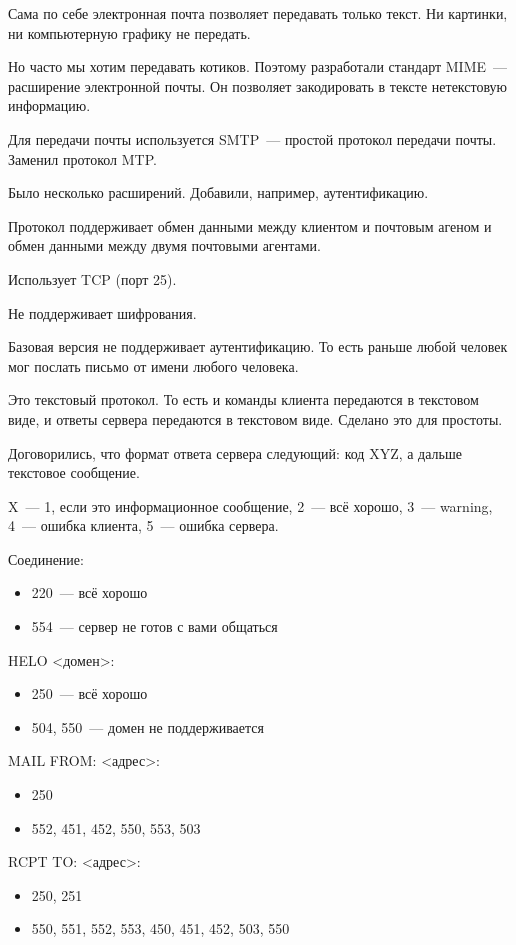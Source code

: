 Сама по себе электронная почта позволяет передавать только текст. Ни картинки, ни компьютерную графику не передать.

Но часто мы хотим передавать котиков. Поэтому разработали стандарт MIME~--- расширение электронной почты. Он позволяет закодировать в тексте нетекстовую информацию.


Для передачи почты используется SMTP~--- простой протокол передачи почты. Заменил протокол MTP.

Было несколько расширений. Добавили, например, аутентификацию. 

Протокол поддерживает обмен данными между клиентом и почтовым агеном и обмен данными между двумя почтовыми агентами.

Использует TCP (порт 25).

Не поддерживает шифрования.

Базовая версия не поддерживает аутентификацию. То есть раньше любой человек мог послать письмо от имени любого человека.

Это текстовый протокол. То есть и команды клиента передаются в текстовом виде, и ответы сервера передаются в текстовом виде. Сделано это для простоты.

Договорились, что формат ответа сервера следующий: код XYZ, а дальше текстовое сообщение.

X~--- 1, если это информационное сообщение, 2~--- всё хорошо, 3~--- warning, 4~--- ошибка клиента, 5~--- ошибка сервера.

Соединение:
\begin{itemize}
    \item 220~--- всё хорошо
    \item 554~--- сервер не готов с вами общаться
\end{itemize}

HELO <домен>:
\begin{itemize}
    \item 250~--- всё хорошо
    \item 504, 550~--- домен не поддерживается
\end{itemize}

MAIL FROM: <адрес>:
\begin{itemize}
    \item 250
    \item 552, 451, 452, 550, 553, 503
\end{itemize}

RCPT TO: <адрес>:
\begin{itemize}
    \item 250, 251
    \item 550, 551, 552, 553, 450, 451, 452, 503, 550
\end{itemize}

